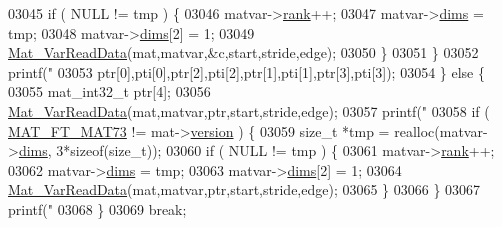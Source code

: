 \begin{DoxyCode}
{{{{{{{{{{{{{{{{{{{{{{{{{{{{{{{{{{{{{03045                             \textcolor{keywordflow}{if} ( NULL != tmp ) \{
03046                                 matvar->\hyperlink{group___m_a_t_a84ba70c96ded13cc555fa75b768d9921}{rank}++;
03047                                 matvar->\hyperlink{group___m_a_t_a8e01234e1c862ce3472bb37f5a09b92c}{dims} = tmp;
03048                                 matvar->\hyperlink{group___m_a_t_a8e01234e1c862ce3472bb37f5a09b92c}{dims}[2] = 1;
03049                                 \hyperlink{group___m_a_t_ga1845000f4fc6252ec5ff11c4b9f0759f}{Mat\_VarReadData}(mat,matvar,&c,start,stride,edge);
03050                             \}
03051                         \}
03052                         printf(\textcolor{stringliteral}{"%
03053                             ptr[0],pti[0],ptr[2],pti[2],ptr[1],pti[1],ptr[3],pti[3]);
03054                     \} \textcolor{keywordflow}{else} \{
03055                         mat\_int32\_t ptr[4];
03056                         \hyperlink{group___m_a_t_ga1845000f4fc6252ec5ff11c4b9f0759f}{Mat\_VarReadData}(mat,matvar,ptr,start,stride,edge);
03057                         printf(\textcolor{stringliteral}{"%
03058                         \textcolor{keywordflow}{if} ( \hyperlink{group___m_a_t_ggad03442b8378999189d510e3745c702b7a765c5d1d5038947646260dc82483517e}{MAT\_FT\_MAT73} != mat->\hyperlink{struct__mat__t_a729c2bc0afc97485057a5af425635b1a}{version} ) \{
03059                             \textcolor{keywordtype}{size\_t} *tmp = realloc(matvar->\hyperlink{group___m_a_t_a8e01234e1c862ce3472bb37f5a09b92c}{dims}, 3*\textcolor{keyword}{sizeof}(\textcolor{keywordtype}{size\_t}));
03060                             \textcolor{keywordflow}{if} ( NULL != tmp ) \{
03061                                 matvar->\hyperlink{group___m_a_t_a84ba70c96ded13cc555fa75b768d9921}{rank}++;
03062                                 matvar->\hyperlink{group___m_a_t_a8e01234e1c862ce3472bb37f5a09b92c}{dims} = tmp;
03063                                 matvar->\hyperlink{group___m_a_t_a8e01234e1c862ce3472bb37f5a09b92c}{dims}[2] = 1;
03064                                 \hyperlink{group___m_a_t_ga1845000f4fc6252ec5ff11c4b9f0759f}{Mat\_VarReadData}(mat,matvar,ptr,start,stride,edge);
03065                             \}
03066                         \}
03067                         printf(\textcolor{stringliteral}{"%
03068                     \}
03069                     \textcolor{keywordflow}{break};
}}}}}}}}}}}}}}}}}}}}}}}}}}}}}}}}}}}}}}}}
\end{DoxyCode}
